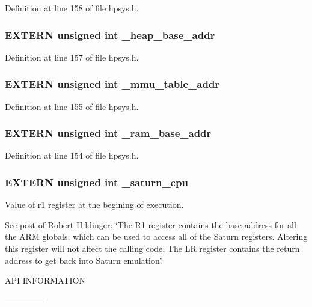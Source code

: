 Definition at line 158 of file hpsys.h.
\subsubsection{\setlength{\rightskip}{0pt plus 5cm}EXTERN unsigned int \_\-heap\_\-base\_\-addr}\label{hpsys_8h_a6}




Definition at line 157 of file hpsys.h.
\subsubsection{\setlength{\rightskip}{0pt plus 5cm}EXTERN unsigned int \_\-mmu\_\-table\_\-addr}\label{hpsys_8h_a4}




Definition at line 155 of file hpsys.h.
\subsubsection{\setlength{\rightskip}{0pt plus 5cm}EXTERN unsigned int \_\-ram\_\-base\_\-addr}\label{hpsys_8h_a3}




Definition at line 154 of file hpsys.h.
\subsubsection{\setlength{\rightskip}{0pt plus 5cm}EXTERN unsigned int \_\-saturn\_\-cpu}\label{hpsys_8h_a2}


Value of r1 register at the begining of execution.

See post of Robert Hildinger: \char`\"{}The R1 register contains the base address for all the ARM globals, which can be used to access all of the Saturn registers. Altering this register will not affect the calling code. The LR register contains the return address to get back into Saturn emulation.\char`\"{}

API INFORMATION\par
 ---------------

